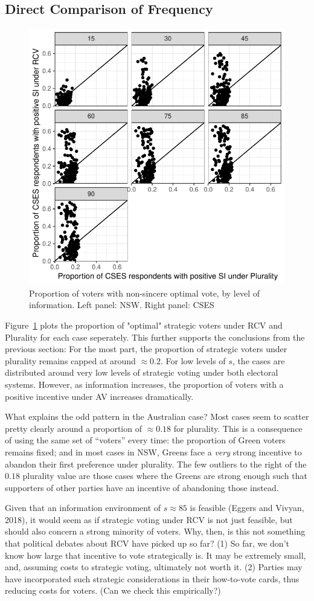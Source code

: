\documentclass[12pt, letter, margin = 1.5 in]{article}
\begin{document}
\subsection{Direct Comparison of Frequency}

\begin{figure}[!h]
	\centering
	\includegraphics[width = .6 \textwidth]{"../output/figures/cses_prop"}
	\caption{Proportion of voters with non-sincere optimal vote, by level of information. Left panel: NSW. Right panel: CSES}
	\label{fig:sv_dist}
\end{figure}

Figure~\ref{fig:sv_dist} plots the proportion of "optimal" strategic voters under RCV and Plurality for each case seperately. This further supports the conclusions from the previous section: For the most part, the proportion of strategic voters under plurality remains capped at around $\approx 0.2$. For low levels of $s$, the cases are distributed around very low levels of strategic voting under both electoral systems. However, as information increases, the proportion of voters with a positive incentive under AV increases dramatically.

What explains the odd pattern in the Australian case? Most cases seem to scatter pretty clearly around a proportion of $\approx 0.18$ for plurality. This is a consequence of using the same set of ``voters'' every time: the proportion of Green voters remains fixed; and in most cases in NSW, Greens face a \textit{very} strong incentive to abandon their first preference under plurality. The few outliers to the right of the $0.18$ plurality value are those cases where the Greens are strong enough such that supporters of other parties have an incentive of abandoning those instead. 

Given that an information environment of $s \approx 85$ is feasible (Eggers and Vivyan, 2018), it would seem as if strategic voting under RCV is not just feasible, but should also concern a strong minority of voters. Why, then, is this not something that political debates about RCV have picked up so far? (1) So far, we don't know how large that incentive to vote strategically is. It may be extremely small, and, assuming costs to strategic voting, ultimately not worth it. (2) Parties may have incorporated such strategic considerations in their how-to-vote cards, thus reducing costs for voters. (Can we check this empirically?)
\end{document}
